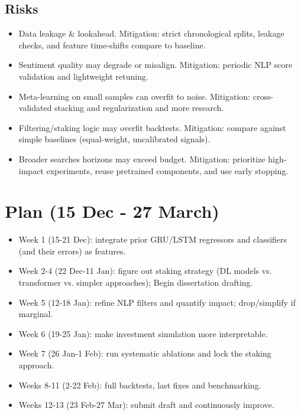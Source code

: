 \documentclass[11pt]{article}
\begin{document}
\subsection{Risks}\label{risks}
\begin{itemize}
\setlength{\itemsep}{1pt}
\setlength{\parskip}{0pt}
\setlength{\parsep}{0pt}
    \item Data leakage \& lookahead. Mitigation: strict chronological splits, leakage checks, and feature time-shifts compare to baseline.
    \item Sentiment quality may degrade or misalign. Mitigation: periodic NLP score validation and lightweight retuning.
    \item Meta-learning on small samples can overfit to noise. Mitigation: cross-validated stacking and regularization and more research.
    \item Filtering/staking logic may overfit backtests. Mitigation: compare against simple baselines (equal-weight, uncalibrated signals).
    \item Broader searches horizons may exceed budget. Mitigation: prioritize high-impact experiments, reuse pretrained components, and use early stopping.
\end{itemize}

\section{Plan (15 Dec - 27 March)}\label{plan}
\begin{itemize}
\setlength{\itemsep}{1pt}
\setlength{\parskip}{0pt}
\setlength{\parsep}{0pt}
    \item Week 1 (15-21 Dec): integrate prior GRU/LSTM regressors and classifiers (and their errors) as features.
    \item Week 2-4 (22 Dec-11 Jan): figure out staking strategy (DL models vs. transformer vs. simpler approaches); Begin dissertation drafting.
    \item Week 5 (12-18 Jan): refine NLP filters and quantify impact; drop/simplify if marginal.
    \item Week 6 (19-25 Jan): make investment simulation more interpretable.
    \item Week 7 (26 Jan-1 Feb): run systematic ablations and lock the staking approach.
    \item Weeks 8-11 (2-22 Feb): full backtests, last fixes and benchmarking.
    \item Weeks 12-13 (23 Feb-27 Mar): submit draft and continuously improve.
\end{itemize}
\end{document}
